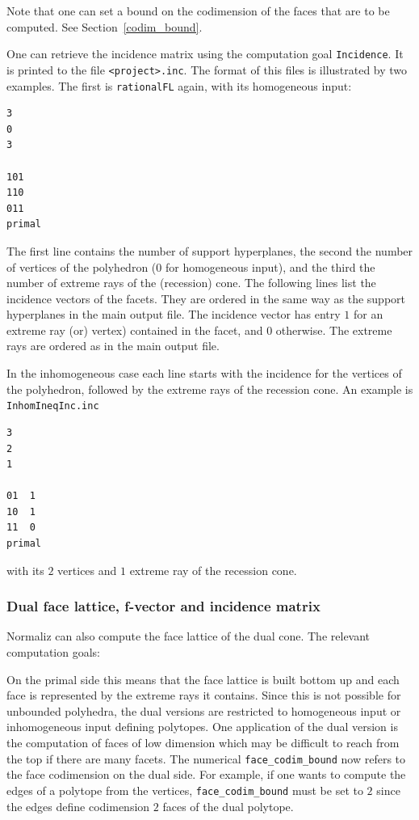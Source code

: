 Note that one can set a bound on the codimension of the faces that are to be computed. See Section~\ref{codim_bound}.

One can retrieve the incidence matrix using the computation goal \verb|Incidence|. It is printed to the file \verb|<project>.inc|. The format of this files is illustrated by two examples. The first is \verb|rationalFL| again, with its homogeneous input:
\begin{Verbatim}
3
0
3

101
110
011
primal
\end{Verbatim}
The first line contains the number of support hyperplanes, the second the number of vertices of the polyhedron ($0$ for homogeneous input), and the third the number of extreme rays of the (recession) cone. The following lines list the incidence vectors of the facets. They are ordered in the same way as the support hyperplanes in the main output file. The incidence vector has entry $1$ for an extreme ray (or) vertex) contained in the facet, and $0$ otherwise. The extreme rays are ordered as in the main output file.

In the inhomogeneous case each line starts with the incidence for the vertices of the polyhedron, followed by the extreme rays of the recession cone. An example is \verb|InhomIneqInc.inc|
\begin{Verbatim}
3
2
1

01  1
10  1
11  0
primal
\end{Verbatim}
with its $2$ vertices and $1$ extreme ray of the recession cone.

\subsubsection{Dual face lattice, f-vector and incidence matrix}

Normaliz can also compute the face lattice of the dual cone.  The relevant computation goals:
\begin{itemize}
	\itemtt[DualFaceLattice]
	\itemtt[Dual[FVector]
	\itemtt[DualIncidence]
\end{itemize}

On the primal side this means that the face lattice is built bottom up and each face is represented by the extreme rays it contains. Since this is not possible for unbounded polyhedra, the dual versions are restricted to homogeneous input or inhomogeneous input defining polytopes. One application of the dual version is the computation of faces of low dimension which may be difficult to reach from the top if there are many facets. The numerical \verb|face_codim_bound| now refers to the face codimension on the dual side. For example, if one wants to compute the edges of a polytope from the vertices, \verb|face_codim_bound| must be set to $2$ since the edges define codimension $2$ faces of the dual polytope.

